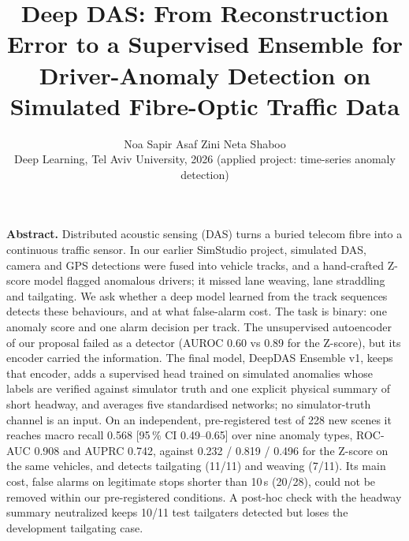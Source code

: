 \documentclass[10pt,a4paper,twocolumn]{article}
\title{\vspace{-14pt}\Large\textbf{Deep DAS: From Reconstruction Error to a Supervised Ensemble for\\ Driver-Anomaly Detection on Simulated Fibre-Optic Traffic Data}\vspace{-2pt}}
\author{\normalsize Noa Sapir \quad Asaf Zini \quad Neta Shaboo \\[-1pt] \small Deep Learning, Tel Aviv University, 2026 (applied project: time-series anomaly detection)\vspace{-14pt}}
\date{}
\newcommand{\EDIV}{DeepDAS Ensemble v1}\newcommand{\dev}{\textit{development}}\newcommand{\val}{\textit{validation}}\newcommand{\ft}{\textit{final test}}
\begin{document}
\maketitle
\thispagestyle{empty}\pagestyle{empty}

\noindent\textbf{Abstract.} Distributed acoustic sensing (DAS) turns a buried telecom fibre into a continuous traffic sensor. In our earlier SimStudio project, simulated DAS, camera and GPS detections were fused into vehicle tracks, and a hand-crafted Z-score model flagged anomalous drivers; it missed lane weaving, lane straddling and tailgating. We ask whether a deep model learned from the track sequences detects these behaviours, and at what false-alarm cost. The task is binary: one anomaly score and one alarm decision per track. The unsupervised autoencoder of our proposal failed as a detector (AUROC 0.60 vs 0.89 for the Z-score), but its encoder carried the information. The final model, \EDIV, keeps that encoder, adds a supervised head trained on simulated anomalies whose labels are verified against simulator truth and one explicit physical summary of short headway, and averages five standardised networks; no simulator-truth channel is an input. On an independent, pre-registered test of 228 new scenes it reaches macro recall 0.568 [95\,\% CI 0.49--0.65] over nine anomaly types, ROC-AUC 0.908 and AUPRC 0.742, against 0.232 / 0.819 / 0.496 for the Z-score on the same vehicles, and detects tailgating (11/11) and weaving (7/11). Its main cost, false alarms on legitimate stops shorter than 10\,s (20/28), could not be removed within our pre-registered conditions. A post-hoc check with the headway summary neutralized keeps 10/11 test tailgaters detected but loses the development tailgating case.
\end{document}
